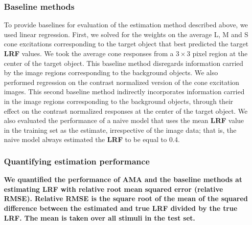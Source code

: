 \documentclass{jov}
\providecommand{\DIFaddtex}[1]{{\bf #1}} %
\providecommand{\DIFdeltex}[1]{} %
\providecommand{\DIFaddbegin}{} %
\providecommand{\DIFaddend}{} %
\providecommand{\DIFdelbegin}{} %
\providecommand{\DIFdelend}{} %
\providecommand{\DIFadd}[1]{\texorpdfstring{\DIFaddtex{#1}}{#1}} %
\providecommand{\DIFdel}[1]{\texorpdfstring{\DIFdeltex{#1}}{}} %
\newcommand{\DIFscaledelfig}{0.5}
\newlength{\DIFdelgraphicswidth} %
\newlength{\DIFdelgraphicsheight} %
\newcommand{\DIFaddincludegraphics}[2][]{{\color{blue}\fbox{\DIFOincludegraphics[#1]{#2}}}} %
\newcommand{\DIFdelincludegraphics}[2][]{%
\sbox{\DIFdelgraphicsbox}{\DIFOincludegraphics[#1]{#2}}%
\settoboxwidth{\DIFdelgraphicswidth}{\DIFdelgraphicsbox} %
\settoboxtotalheight{\DIFdelgraphicsheight}{\DIFdelgraphicsbox} %
\scalebox{\DIFscaledelfig}{%
\parbox[b]{\DIFdelgraphicswidth}{\usebox{\DIFdelgraphicsbox}\\[-\baselineskip] \rule{\DIFdelgraphicswidth}{0em}}\llap{\resizebox{\DIFdelgraphicswidth}{\DIFdelgraphicsheight}{%
\setlength{\unitlength}{\DIFdelgraphicswidth}%
\begin{picture}(1,1)%
\thicklines\linethickness{2pt} %
{\color[rgb]{1,0,0}\put(0,0){\framebox(1,1){}}}%
{\color[rgb]{1,0,0}\put(0,0){\line( 1,1){1}}}%
{\color[rgb]{1,0,0}\put(0,1){\line(1,-1){1}}}%
\end{picture}%
}\hspace*{3pt}}} %
} %
\DeclareRobustCommand{\DIFaddbegin}{\DIFOaddbegin \let\includegraphics\DIFaddincludegraphics} %
\DeclareRobustCommand{\DIFaddend}{\DIFOaddend \let\includegraphics\DIFOincludegraphics} %
\DeclareRobustCommand{\DIFdelbegin}{\DIFOdelbegin \let\includegraphics\DIFdelincludegraphics} %
\DeclareRobustCommand{\DIFdelend}{\DIFOaddend \let\includegraphics\DIFOincludegraphics} %
\begin{document}
\subsubsection*{Baseline methods}
To provide baselines for evaluation of the estimation method described above, we used linear regression.
First, we solved for the weights on the average L, M and S cone excitations corresponding to the target object that best predicted the target \DIFdelbegin \DIFdel{LRV }\DIFdelend \DIFaddbegin \DIFadd{LRF }\DIFaddend values.
We took the average cone responses from a $3 \times 3$ pixel region at the center of the target object.
This baseline method disregards information carried by the image regions corresponding to the background objects.
We also performed regression on the contrast normalized version of the cone excitation images.
This second baseline method indirectly incorporates information carried in the image regions corresponding to the background objects,
through their effect on the contrast normalized responses at the center of the target object. 
We also evaluated the performance of a naive model that uses the mean \DIFdelbegin \DIFdel{LRV }\DIFdelend \DIFaddbegin \DIFadd{LRF }\DIFaddend value in the training set as the estimate, irrespective
of the image data; that is, the naive model always estimated the \DIFdelbegin \DIFdel{LRV }\DIFdelend \DIFaddbegin \DIFadd{LRF }\DIFaddend to be equal to 0.4.

\DIFaddbegin \subsubsection*{\DIFadd{Quantifying estimation performance}}
\DIFadd{We quantified the performance of AMA and the baseline methods at estimating LRF with relative root mean squared error (relative RMSE). Relative RMSE is the square root of the mean of the squared difference between the estimated and true LRF divided by the true LRF. The mean is taken over all stimuli in the test set. 
}
\end{document}
